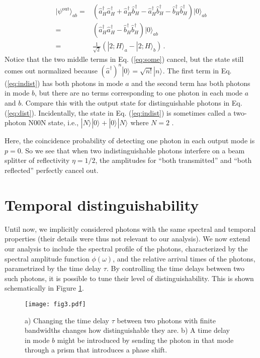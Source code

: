 \documentclass[12pt]{article}
\newcommand{\ket}[2] {| #1 \rangle_{#2}}
\newcommand{\dg}{^{\dagger}}
\begin{document}
\begin{align}\label{eq:some}
\ket{\psi^{\mathrm{out}}}{ab}={}&\left(\hat{a}\dg_{H}\hat{a}\dg_{H}+\hat{a}\dg_{H}\hat{b}\dg_{H}-\hat{a}\dg_{H}\hat{b}\dg_{H}-\hat{b}\dg_{H}\hat{b}\dg_{H}\right)\ket{0}{ab}\\
={}&\left(\hat{a}\dg_{H}\hat{a}\dg_{H}-\hat{b}\dg_{H}\hat{b}\dg_{H}\right)\ket{0}{ab}\\\label{eq:indist}
={}&\frac{1}{\sqrt{2}}\left(\ket{2;H}{a}-\ket{2;H}{b}\right)\,.
\end{align}
Notice that the two middle terms in Eq. (\ref{eq:some}) cancel, but the state still comes out normalized because $(\hat{a}\dg)^{n}\ket{0}{}=\sqrt{n!}\ket{n}{}$. The first term in Eq. (\ref{eq:indist}) has both photons in mode $a$ and the second term has both photons in mode $b$, but there are no terms corresponding to one photon in each mode $a$ and $b$. Compare this with the output state for distinguishable photons in Eq. (\ref{eq:dist}). Incidentally, the state  in Eq. (\ref{eq:indist}) is sometimes called a two-photon N00N state, i.e., $\ket{N}{}\ket{0}{}+\ket{0}{}\ket{N}{}$ where $N=2$ \cite{Lee2002}.

Here, the coincidence probability of detecting one photon in each output mode is  $p=0$. So we see that when two indistinguishable photons interfere on a beam splitter of reflectivity $\eta=1/2$, the amplitudes for ``both transmitted'' and ``both reflected'' perfectly cancel out.


\section{Temporal distinguishability}\label{sec:temp}


Until now, we implicitly considered  photons with the same spectral and temporal properties (their details were thus not relevant to our analysis). We now extend our analysis to include the spectral profile of the photons, characterized by the spectral amplitude function $\phi(\omega)$, and the relative arrival times of the photons, parametrized by the time delay $\tau$.  By controlling the time delays between two such photons, it is possible to tune their level of distinguishability. This is shown schematically in Figure \ref{fig:tune}. 

\begin{figure}[h]
\begin{center}
\texttt{[image: fig3.pdf]}
\caption{a) Changing the time delay $\tau$ between two photons with  finite bandwidths changes how distinguishable they are. b) A time delay  in mode $b$ might be introduced by sending the photon in that mode  through a prism that introduces a phase shift. }
\label{fig:tune}
\end{center}
\end{figure}
\end{document}
